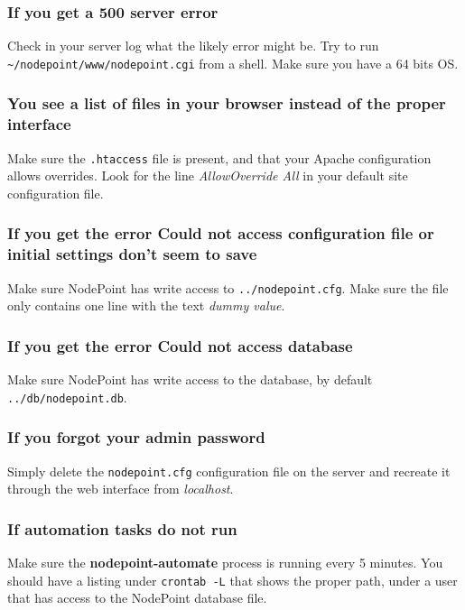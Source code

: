 \documentclass[11pt]{article}
\begin{document}
{
\subsubsection{If you get a 500 server error}

Check in your server log what the likely error might be. Try to run \texttt{\textasciitilde/nodepoint/www/nodepoint.cgi} from a shell. Make sure you have a 64 bits OS.

\subsubsection{You see a list of files in your browser instead of the proper interface}

Make sure the \texttt{.htaccess} file is present, and that your Apache configuration allows overrides. Look for the line \textit{AllowOverride All} in your default site configuration file.

\subsubsection{If you get the error Could not access configuration file or initial settings don't seem to save}

Make sure NodePoint has write access to \texttt{../nodepoint.cfg}. Make sure the file only contains one line with the text \textit{dummy value}.

\subsubsection{If you get the error Could not access database}

Make sure NodePoint has write access to the database, by default \texttt{../db/nodepoint.db}.

\subsubsection{If you forgot your admin password}

Simply delete the \texttt{nodepoint.cfg} configuration file on the server and recreate it through the web interface from \textit{localhost}.

\subsubsection{If automation tasks do not run}

Make sure the \textbf{nodepoint-automate} process is running every 5 minutes. You should have a listing under \texttt{crontab -L} that shows the proper path, under a user that has access to the NodePoint database file.
}
\end{document}
